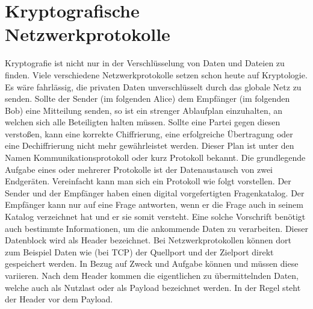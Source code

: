 \chapter{Kryptografische Netzwerkprotokolle}

Kryptografie ist nicht nur in der Verschlüsselung von Daten und Dateien zu finden. Viele verschiedene Netzwerkprotokolle setzen schon heute auf Kryptologie. Es wäre fahrlässig, die privaten Daten unverschlüsselt durch das globale Netz zu senden. Sollte der Sender (im folgenden Alice) dem Empfänger (im folgenden Bob) eine Mitteilung senden, so ist ein strenger Ablaufplan einzuhalten, an welchen sich alle Beteiligten halten müssen. Sollte eine Partei gegen diesen verstoßen, kann eine korrekte Chiffrierung, eine erfolgreiche Übertragung oder eine Dechiffrierung nicht mehr gewährleistet werden. Dieser Plan ist unter den Namen Kommunikationsprotokoll oder kurz Protokoll bekannt. Die grundlegende Aufgabe eines oder mehrerer Protokolle ist der Datenaustausch von zwei Endgeräten. Vereinfacht kann man sich ein Protokoll wie folgt vorstellen. Der Sender und der Empfänger haben einen digital vorgefertigten Fragenkatalog. Der Empfänger kann nur auf eine Frage antworten, wenn er die Frage auch in seinem Katalog verzeichnet hat und er sie somit versteht. Eine solche Vorschrift benötigt auch bestimmte Informationen, um die ankommende Daten zu verarbeiten. Dieser Datenblock wird als Header bezeichnet. Bei Netzwerkprotokollen können dort zum Beispiel Daten wie (bei TCP) der Quellport und der Zielport direkt gespeichert werden. In Bezug auf Zweck und Aufgabe können und müssen diese variieren. Nach dem Header kommen die eigentlichen zu übermittelnden Daten, welche auch als Nutzlast oder als Payload bezeichnet werden. In der Regel steht der Header vor dem Payload. \\

